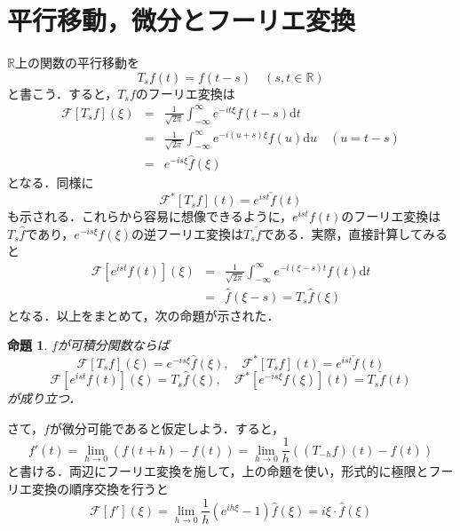 \documentclass[a4j]{jsbook}
\newtheorem{prop}[theorem]{命題}
\numberwithin{theorem}{chapter}  %
\begin{document}
\section{平行移動，微分とフーリエ変換} \label{sec3-6}
\(\mathbb{R}\)上の関数の平行移動を
\begin{equation*}
    T_s f(t)=f(t-s)\quad(s, t\in\mathbb{R})
\end{equation*}
と書こう．すると，\(T_s f\)のフーリエ変換は
\begin{eqnarray*}
\mathcal{F}[T_s f](\xi)&=&\frac{1}{\sqrt{2\pi}}\int_{-\infty}^\infty e^{-it\xi}f(t-s)\mathrm{d}t \\
&=&\frac{1}{\sqrt{2\pi}}\int_{-\infty}^\infty e^{-i(u+s)\xi}f(u)\mathrm{d}u\quad(u=t-s) \\
&=&e^{-is\xi}\hat{f}(\xi)
\end{eqnarray*}
となる．同様に
\begin{equation*}
    \mathcal{F}^*[T_sf](t)=e^{ist}\check{f}(t)
\end{equation*}
も示される．これらから容易に想像できるように，\(e^{ist}f(t)\)のフーリエ変換は\(T_s\hat{f}\)であり，\(e^{-is\xi}f(\xi)\)の逆フーリエ変換は\(T_s\check{f}\)である．実際，直接計算してみると
\begin{eqnarray*}
\mathcal{F}\left[e^{ist}f(t)\right](\xi)&=&\frac{1}{\sqrt{2\pi}}\int_{-\infty}^\infty e^{-i(\xi-s)t}f(t)\mathrm{d}t \\
&=&\hat{f}(\xi-s)=T_s\hat{f}(\xi)
\end{eqnarray*}
となる．以上をまとめて，次の命題が示された．
\begin{prop}
\label{prop3-8}
\(f\)が可積分関数ならば
\begin{equation*}
    \mathcal{F}[T_s f](\xi)=e^{-is\xi}\hat{f}(\xi),\quad \mathcal{F}^*[T_sf](t)=e^{ist}\check{f}(t)
\end{equation*}
\begin{equation*}
    \mathcal{F}\left[e^{ist}f(t)\right](\xi)=T_s\hat{f}(\xi),\quad \mathcal{F}^*\left[e^{-is\xi}f(\xi)\right](t)=T_s\check{f}(t)
\end{equation*}
が成り立つ．
\end{prop}
さて，\(f\)が微分可能であると仮定しよう．すると，
\begin{equation*}
    f'(t)=\lim_{h\to 0}\left(f(t+h)-f(t)\right)=\lim_{h\to 0}\frac{1}{h}\left((T_{-h}f)(t)-f(t)\right)
\end{equation*}
と書ける．両辺にフーリエ変換を施して，上の命題を使い，形式的に極限とフーリエ変換の順序交換を行うと
\begin{equation*}
    \mathcal{F}[f'](\xi)=\lim_{h\to 0}\frac{1}{h}\left(e^{ih\xi}-1\right)\hat{f}(\xi)=i\xi\cdot\hat{f}(\xi)
\end{equation*}
\end{document}
